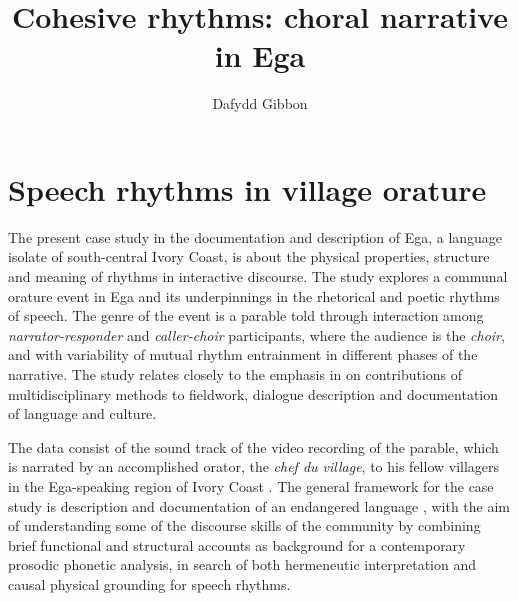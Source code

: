 \documentclass[output=paper,colorlinks,citecolor=brown
]{langscibook}
\author{Dafydd Gibbon\orcid{0000-0002-9825-5516}\affiliation{Bielefeld University}}
\title{Cohesive rhythms: choral narrative in Ega}
\begin{document}
\maketitle


\section{Speech rhythms in village orature}

The present case study in the documentation and description of Ega, a language isolate of south-central Ivory Coast, is about the physical properties, structure and meaning of rhythms in interactive discourse. The study explores a communal orature event in Ega and its underpinnings in the rhetorical and poetic rhythms of speech. The genre of the event is a parable told through interaction among \textit{narrator-responder} and \textit{caller-choir} participants, where the audience is the \textit{choir}, and with variability of mutual rhythm entrainment in different phases of the narrative. The study relates closely to the emphasis in \cite{sakeleverett2012} on contributions of multidisciplinary methods to fieldwork, dialogue description and documentation of language and culture.

The data consist of the sound track of the video recording of the parable, which is narrated by an accomplished orator, the \textit{chef du village}, to his fellow villagers in the Ega-speaking region of Ivory Coast \cite{rossinigibbon2011}. The general framework for the case study is description and documentation of an endangered language \cite{gibbonbowbirdhughes2004}, with the aim of understanding some of the discourse skills of the community by combining brief functional and structural accounts as background for a contemporary prosodic phonetic analysis, in search of both hermeneutic interpretation and causal physical grounding for speech rhythms.
\end{document}
